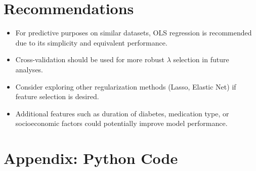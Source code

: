 \documentclass{article}
\begin{document}
\section{Recommendations}

\begin{itemize}
    \item For predictive purposes on similar datasets, OLS regression is recommended due to its simplicity and equivalent performance.
    \item Cross-validation should be used for more robust $\lambda$ selection in future analyses.
    \item Consider exploring other regularization methods (Lasso, Elastic Net) if feature selection is desired.
    \item Additional features such as duration of diabetes, medication type, or socioeconomic factors could potentially improve model performance.
\end{itemize}

\clearpage
\section*{Appendix: Python Code}
\end{document}
